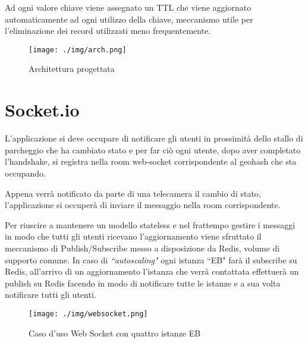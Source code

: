 Ad ogni valore chiave viene assegnato un TTL che viene aggiornato automaticamente ad ogni utilizzo della chiave, meccanismo utile per l'eliminazione dei record utilizzati meno frequentemente.
\begin{figure}[!htb]
	\centering
		\texttt{[image: ./img/arch.png]}
		\caption{Architettura progettata}

		
\end{figure}
\cleardoublepage
\section{Socket.io}
L'applicazione si deve occupare di notificare gli utenti in prossimità dello stallo di parcheggio che ha cambiato stato e per far ciò ogni utente, dopo aver completato l'handshake, si registra nella room web-socket corrispondente al geohash che sta occupando. 

Appena verrà notificato da parte di una telecamera il cambio di stato, l'applicazione si occuperà di inviare il messaggio nella room corrispondente. 

Per riuscire a mantenere un modello stateless e nel frattempo gestire i messaggi in modo che tutti gli utenti ricevano l'aggiornamento viene sfruttato il meccanismo di Publish/Subscribe messo a disposizione da Redis, volume di supporto comune. In caso di \textit{``autoscaling"} ogni istanza ``EB" farà il subscribe su Redis, all'arrivo di un aggiornamento l'istanza che verrà contattata effettuerà un publish su Redis facendo in modo di notificare tutte le istanze e a sua volta notificare tutti gli utenti.



\begin{figure}[!h]
	\centering 
		\texttt{[image: ./img/websocket.png]}
		\caption{Caso d'uso Web Socket con quattro istanze EB}
\end{figure}


